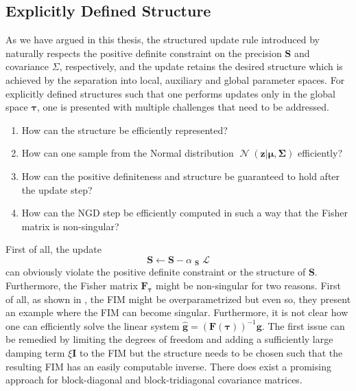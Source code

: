 \documentclass[a4paper, 11pt, oneside]{scrartcl}
\theoremstyle{break}
\DeclareMathOperator{\Normal}{\mathcal{N}}
\DeclareMathOperator{\ngrad}{\tilde{\nabla}}
\newcommand{\matr}[1]{\boldsymbol{#1}}
\numberwithin{equation}{section}
\begin{document}
		\subsection{Explicitly Defined Structure}
			As we have argued in this thesis, the structured update rule introduced by \parencite{LNK+21} naturally respects the positive definite constraint on the precision $\matr{S}$ and covariance $\Sigma$, respectively, and the update retains the desired structure which is achieved by the separation into local, auxiliary and global parameter spaces. 
			For explicitly defined structures such that one performs updates only in the global space $\matr{\tau}$, one is presented with multiple challenges that need to be addressed. 
			\begin{enumerate}
				\item
					How can the structure be efficiently represented?
				\item
					How can one sample from the Normal distribution $\Normal(\matr{z} | \matr{\mu}, \matr{\Sigma})$ efficiently?
				\item
					How can the positive definiteness and structure be guaranteed to hold after the update step?
				\item 
					How can the NGD step be efficiently computed in such a way that the Fisher matrix is non-singular?
			\end{enumerate}
			First of all, the update 
			\begin{equation*}
				\matr{S} \leftarrow \matr{S} - \alpha \ngrad_{\matr{S}} \mathcal{L}
			\end{equation*}
			can obviously violate the positive definite constraint or the structure of $\matr{S}$.
			Furthermore, the Fisher matrix $\matr{F}_{\matr{\tau}}$ might be non-singular for two reasons.
			First of all, as shown in \parencite[J.1.6]{LNK+21}, the FIM might be overparametrized but even so, they present an example where the FIM can become singular. 
			Furthermore, it is not clear how one can efficiently solve the linear system $\matr{\hat{g}} = (\matr{F}( \matr{\tau} ) )^{-1} \matr{g}$.
			The first issue can be remedied by limiting the degrees of freedom and adding a sufficiently large damping term $\xi \matr{I}$ to the FIM but the structure needs to be chosen such that the resulting FIM has an easily computable inverse. 
			There does exist a promising approach for block-diagonal and block-tridiagonal covariance matrices.
\end{document}
